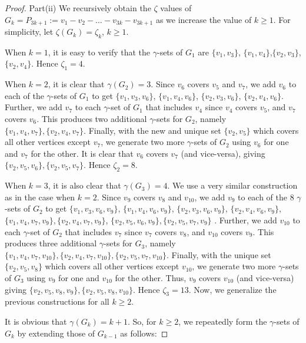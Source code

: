\documentclass[10pt,a4paper]{amsart}
\begin{document}
\begin{proof}
	Part(ii)
	We recursively obtain the $\zeta$ values of $G_k=P_{3k+1}:=v_1-v_2-\ldots-v_{3k}-v_{3k+1}$ as we increase the value of $k\ge 1$. For simplicity, let $\zeta(G_k)=\zeta_k$, $k\ge 1$.
	
	When $k=1$, it is easy to verify that the $\gamma$-sets of $G_1$ are $\{v_1,v_3\}$, $\{v_1,v_4\}$,$\{v_2,v_3\}$, $\{v_2,v_4\}$. Hence $\zeta_1=4$.
	
	When $k=2$, it is clear that $\gamma(G_2)=3$. Since $v_6$ covers $v_5$ and $v_7$, we add $v_6$ to each of the $\gamma$-sets of $G_1$ to get $\{v_1,v_3, v_6\}$, $\{v_1,v_4, v_6\}$, $\{v_2,v_3, v_6\}$, $\{v_2,v_4, v_6\}$. Further, we add $v_7$ to each $\gamma$-set of $G_1$ that includes $v_4$ since $v_4$ covers $v_5$, and $v_7$ covers $v_6$. This produces two additional $\gamma$-sets for $G_2$, namely $\{v_1,v_4, v_7\}, \{v_2,v_4, v_7\}$. Finally, with the new and unique set $\{v_2, v_5\}$ which covers all other vertices except $v_7$, we generate two more $\gamma$-sets of $G_2$ using $v_6$ for one and $v_7$ for the other. It is clear that $v_6$ covers $v_7$ (and vice-versa), giving  $\{v_2,v_5, v_6\}, \{v_2, v_5, v_7\}$. Hence $\zeta_2=8$.
	
	When $k=3$, it is also clear that $\gamma(G_3)=4$. We use a very similar construction as in the case when $k=2$. Since $v_9$ covers $v_8$ and $v_{10}$, we add $v_9$ to each of the $8$ $\gamma$-sets of $G_2$ to get 
	$\{v_1,v_3, v_6, v_9\}$, $\{v_1,v_4, v_6, v_9\}$, $\{v_2,v_3, v_6, v_9\}$, $\{v_2,v_4, v_6, v_9\}$, $\{v_1,v_4, v_7, v_9\}, \{v_2,v_4, v_7, v_9\}$, $\{v_2,v_5, v_6, v_9\}, \{v_2, v_5, v_7, v_9\}$
	. Further, we add $v_{10}$ to each $\gamma$-set of $G_2$ that includes $v_7$ since $v_7$ covers $v_8$, and $v_{10}$ covers $v_{9}$. This produces three additional $\gamma$-sets for $G_3$, namely $\{v_1,v_4, v_7, v_{10}\}, \{v_2,v_4, v_7, v_{10}\}, \{v_2, v_5, v_7, v_{10}\}$. Finally, with the unique set $\{v_2, v_5, v_8\}$ which covers all other vertices except $v_{10}$, we generate two more $\gamma$-sets of $G_3$ using $v_9$ for one and $v_{10}$ for the other. Thus, $v_9$ covers $v_{10}$ (and vice-versa) giving  $\{v_2,v_5, v_8, v_9\}, \{v_2, v_5, v_8, v_{10}\}$. Hence $\zeta_3=13$. Now, we generalize the previous constructions for all $k\ge 2$.
	
	It is obvious that $\gamma(G_k)=k+1$. So, for $k\ge 2$, we repeatedly form the $\gamma$-sets of $G_k$ by extending those of $G_{k-1}$ as follows:
	

\end{proof}
\end{document}
